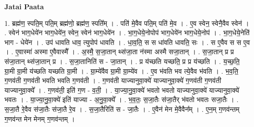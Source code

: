 \documentclass[17pt]{extarticle}
\begin{document}
\textbf{Jatai Paata} \newline

1. ब्रह्म॑ण॒ स्पति॒म् पति॒म् ब्रह्म॑णो॒ ब्रह्म॑ण॒ स्पति᳚म् । . पति॑ मे॒वैव पति॒म् पति॑ मे॒व । . ए॒व स्वेन॒ स्वेनै॒वैव स्वेन॑ । . स्वेन॑ भाग॒धेये॑न भाग॒धेये॑न॒ स्वेन॒ स्वेन॑ भाग॒धेये॑न । . भा॒ग॒धेये॒नोपोप॑ भाग॒धेये॑न भाग॒धेये॒नोप॑ । . भा॒ग॒धेये॒नेति॑ भाग - धेये॑न । . उप॑ धावति धाव॒ त्युपोप॑ धावति । . धा॒व॒ति॒ स स धा॑वति धावति॒ सः । . स ए॒वैव स स ए॒व । . ए॒वास्मा॑ अस्मा ए॒वैवास्मै᳚ । . अ॒स्मै॒ स॒जा॒तान् थ्स॑जा॒ता न॑स्मा अस्मै सजा॒तान् । . स॒जा॒तान् प्र प्र स॑जा॒तान् थ्स॑जा॒तान् प्र । . स॒जा॒तानिति॑ स - जा॒तान् । . प्र य॑च्छति यच्छति॒ प्र प्र य॑च्छति । . य॒च्छ॒ति॒ ग्रा॒मी ग्रा॒मी य॑च्छति यच्छति ग्रा॒मी । . ग्रा॒म्ये॑वैव ग्रा॒मी ग्रा॒म्ये॑व । . ए॒व भ॑वति भव त्ये॒वैव भ॑वति । . भ॒व॒ति॒ ग॒णव॑ती ग॒णव॑ती भवति भवति ग॒णव॑ती । . ग॒णव॑ती याज्यानुवा॒क्ये॑ याज्यानुवा॒क्ये॑ ग॒णव॑ती ग॒णव॑ती याज्यानुवा॒क्ये᳚ । . ग॒णव॑ती॒ इति॑ ग॒ण - व॒ती॒ । . या॒ज्या॒नु॒वा॒क्ये॑ भवतो भवतो याज्यानुवा॒क्ये॑ याज्यानुवा॒क्ये॑ भवतः । . या॒ज्या॒नु॒वा॒क्ये॑ इति॑ याज्या - अ॒नु॒वा॒क्ये᳚ । . भ॒व॒तः॒ स॒जा॒तैः स॑जा॒तैर् भ॑वतो भवतः सजा॒तैः । . स॒जा॒तै रे॒वैव स॑जा॒तैः स॑जा॒तै रे॒व । . स॒जा॒तैरिति॑ स - जा॒तैः । . ए॒वैन॑ मेन मे॒वैवैन᳚म् । . ए॒न॒म् ग॒णव॑न्तम् ग॒णव॑न्त मेन मेनम् ग॒णव॑न्तम् । \newline
\end{document}
